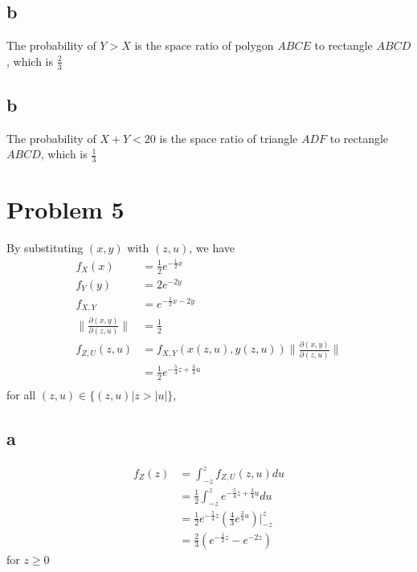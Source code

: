 \documentclass[12pt,letterpaper]{article}
\begin{document}
    \subsection*{b}
        The probability of $Y > X$ is the space ratio of polygon $ABCE$ to rectangle $ABCD$, which is $\frac{2}{3}$
    \subsection*{b}
        The probability of $X + Y < 20$ is the space ratio of triangle $ADF$ to rectangle $ABCD$, which is $\frac{1}{3}$

\section*{Problem 5}
    By substituting $(x, y)$ with $(z, u)$, we have
    \begin{equation*}
        \begin{aligned}
            f_{X}(x) &= \frac{1}{2}e^{-\frac{1}{2}x} \\
            f_{Y}(y) &= 2e^{-2y} \\
            f_{X, Y} &= e^{-\frac{1}{2}x - 2y} \\
            \|\frac{\partial{(x, y)}}{\partial{(z, u)}}\| &= \frac{1}{2} \\
            f_{Z, U}(z, u) &= f_{X, Y}(x(z, u), y(z, u))\|\frac{\partial{(x, y)}}{\partial{(z, u)}}\| \\
            &= \frac{1}{2} e^{-\frac{5}{4}z + \frac{3}{4}u} \\
        \end{aligned}
    \end{equation*}
    for all $(z, u) \in \{(z, u) | z > |u|\}$,
    \subsection*{a}
        \begin{equation*}
            \begin{aligned}
                f_{Z}(z) &= \int_{-z}^{z}f_{Z, U}(z, u) du \\
                &= \frac{1}{2} \int_{-z}^{z} e^{-\frac{5}{4}z + \frac{3}{4}u} du \\
                &= \frac{1}{2}e^{-\frac{5}{4}z}(\frac{4}{3}e^{\frac{3}{4}u})|_{-z}^{z} \\
                &= \frac{2}{3}(e^{-\frac{1}{2}z} - e^{-2z})
            \end{aligned}
        \end{equation*}
        for $z \geq 0$
\end{document}
